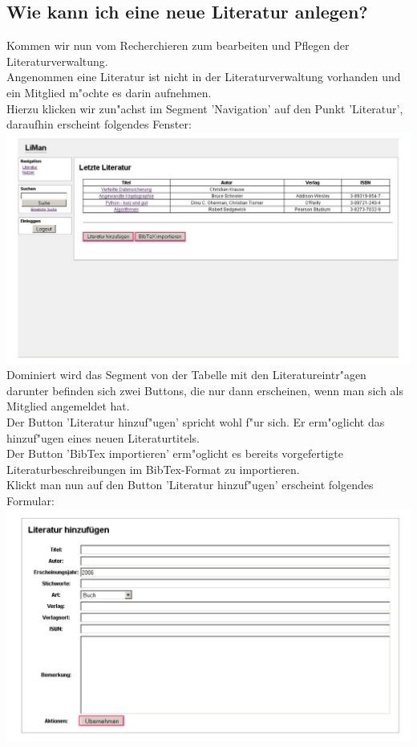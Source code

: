 \subsection{Wie kann ich eine neue Literatur anlegen?}
Kommen wir nun vom Recherchieren zum bearbeiten und Pflegen der Literaturverwaltung.\\
Angenommen eine Literatur ist nicht in der Literaturverwaltung vorhanden und ein Mitglied m"ochte es darin aufnehmen.\\
Hierzu klicken wir zun"achst im Segment 'Navigation' auf den Punkt 'Literatur', daraufhin erscheint folgendes Fenster:\\
\includegraphics[scale=0.8]{lit_ins}\\
Dominiert wird das Segment von der Tabelle mit den Literatureintr"agen darunter befinden sich zwei Buttons, die nur dann erscheinen, wenn man sich als Mitglied angemeldet hat.\\
Der Button 'Literatur hinzuf"ugen' spricht wohl f"ur sich. Er erm"oglicht das hinzuf"ugen eines neuen Literaturtitels.\\
Der Button 'BibTex importieren' erm"oglicht es bereits vorgefertigte Literaturbeschreibungen im BibTex-Format zu importieren.\\
Klickt man nun auf den Button 'Literatur hinzuf"ugen' erscheint folgendes Formular:\\
\includegraphics[scale=0.8]{lit_ins1}\\
